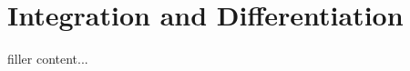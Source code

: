 \documentclass[../../templates/section]{subfiles}
\begin{document}
\section{Integration and Differentiation}\label{sec:integration-and-differentiation}

filler content...
\end{document}
